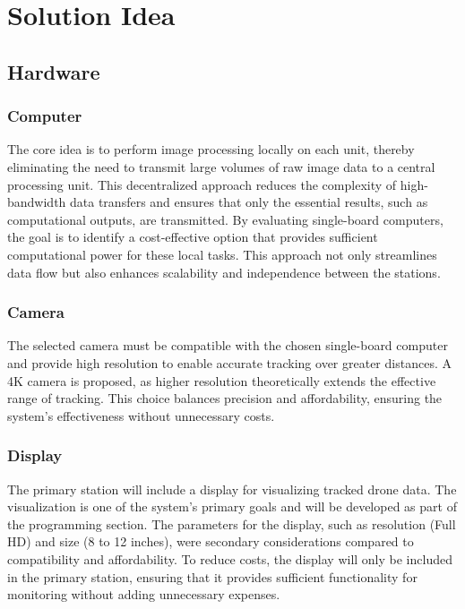 \chapter{Solution Idea}

\section{Hardware}

\subsection{Computer}
The core idea is to perform image processing locally on each unit, thereby eliminating the need to transmit large volumes of raw image data to a central processing unit. This decentralized approach reduces the complexity of high-bandwidth data transfers and ensures that only the essential results, such as computational outputs, are transmitted. By evaluating single-board computers, the goal is to identify a cost-effective option that provides sufficient computational power for these local tasks. This approach not only streamlines data flow but also enhances scalability and independence between the stations.

\subsection{Camera}
The selected camera must be compatible with the chosen single-board computer and provide high resolution to enable accurate tracking over greater distances. A 4K camera is proposed, as higher resolution theoretically extends the effective range of tracking. This choice balances precision and affordability, ensuring the system's effectiveness without unnecessary costs.

\subsection{Display}
The primary station will include a display for visualizing tracked drone data. The visualization is one of the system's primary goals and will be developed as part of the programming section. The parameters for the display, such as resolution (Full HD) and size (8 to 12 inches), were secondary considerations compared to compatibility and affordability. To reduce costs, the display will only be included in the primary station, ensuring that it provides sufficient functionality for monitoring without adding unnecessary expenses.

